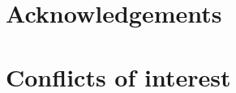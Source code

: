 \documentclass[9pt, twocolumn, lineno]{templates/pi/pi-article}
\begin{document}
\if{}
    
\fi\if{}
    
\fi\if{}
    
\fi\if{}
    
\fi



\if{}
    
\else
\section*{Acknowledgements}
    
\section*{Conflicts of interest}
    
\fi



\end{document}
